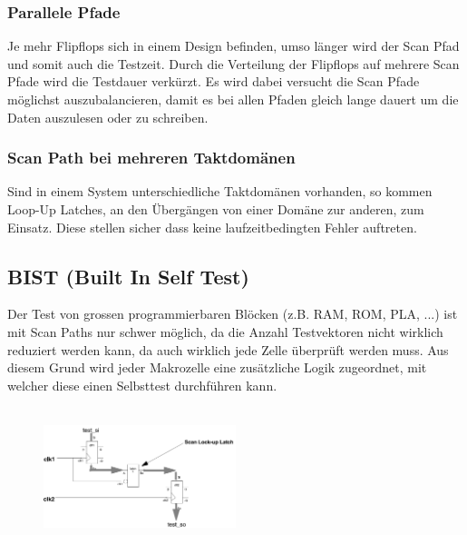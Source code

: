 \subsubsection{Parallele Pfade}
Je mehr Flipflops sich in einem Design befinden, umso länger wird der Scan Pfad und somit auch die Testzeit. Durch die Verteilung der Flipflops auf mehrere Scan Pfade wird die Testdauer verkürzt. Es wird dabei versucht die Scan Pfade möglichst auszubalancieren, damit es bei allen Pfaden gleich lange dauert um die Daten auszulesen oder zu schreiben.

\begin{multicols}{2}
    \subsubsection{Scan Path bei mehreren Taktdomänen}
    Sind in einem System unterschiedliche Taktdomänen vorhanden, so kommen Loop-Up Latches, an den Übergängen von einer Domäne zur anderen, zum Einsatz. Diese stellen sicher dass keine laufzeitbedingten Fehler auftreten.
    
    \subsection{BIST (Built In Self Test)}
    Der Test von grossen programmierbaren Blöcken (z.B. RAM, ROM, PLA, ...) ist mit Scan Paths nur schwer möglich, da die Anzahl Testvektoren nicht wirklich reduziert werden kann, da auch wirklich jede Zelle überprüft werden muss. Aus diesem Grund wird jeder Makrozelle eine zusätzliche Logik zugeordnet, mit welcher diese einen Selbsttest durchführen kann. \ \\ \ \\
    \begin{figure}[H]
        \includegraphics[width=0.5\textwidth]{images/scanpath_lookuplatch.png}
    \end{figure}
\end{multicols}


